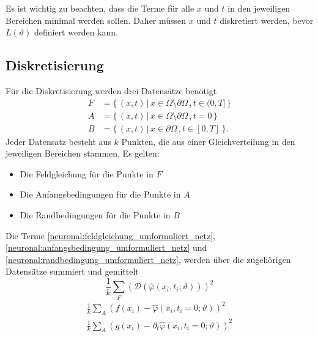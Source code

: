 Es ist wichtig zu beachten, dass die Terme für alle $x$ und $t$ in den jeweiligen Bereichen minimal werden sollen.
Daher müssen $x$ und $t$ diskretiert werden, bevor $L(\vartheta)$ definiert werden kann.

\subsection{Diskretisierung}\label{neuronal:subsection:diskretierung}
Für die Diskretisierung werden drei Datensätze benötigt
\begin{equation}
    \begin{aligned}
        F &= \{\, (x, t) \,|\, x \in \Omega \setminus \partial \Omega\,, t \in (0,T] \,\}\\
        A &= \{\, (x, t) \,|\, x \in \Omega \setminus \partial \Omega\,, t = 0 \,\}\\
        B &= \{\, (x, t) \,|\, x \in \partial \Omega\,, t \in [0, T] \,\}.
    \end{aligned}
\end{equation}
Jeder Datensatz besteht aus $k$ Punkten, die aus einer Gleichverteilung in den jeweiligen Bereichen stammen.
Es gelten:
\begin{itemize}
    \item Die Feldgleichung für die Punkte in $F$
    \item Die Anfangsbedingungen für die Punkte in $A$
    \item Die Randbedingungen für die Punkte in $B$
\end{itemize}
Die Terme \eqref{neuronal:feldgleichung_umformuliert_netz}, \eqref{neuronal:anfangsbedingung_umformuliert_netz} und \eqref{neuronal:randbedingung_umformuliert_netz}, werden über die zugehörigen Datensätze summiert und gemittelt
\begin{equation}
    \frac{1}{k} \sum_{F}^{} \left(\mathcal{D}(\hat{\varphi}(x_i, t_i; \vartheta))\right)^2
    \label{neuronal:feldgleichung_umformuliert_netz_disk}
\end{equation}
\begin{equation}
    \begin{aligned}
        \frac{1}{k} \sum_{A}^{} \left(f(x_i) - \hat{\varphi}(x_i, t_i = 0; \vartheta)\right)^2\\
        \frac{1}{k} \sum_{A}^{} \left(g(x_i) - \partial_t \hat{\varphi}(x_i, t_i = 0; \vartheta)\right)^2
    \end{aligned}
    \label{neuronal:anfangsbedingung_umformuliert_netz_disk}
\end{equation}

